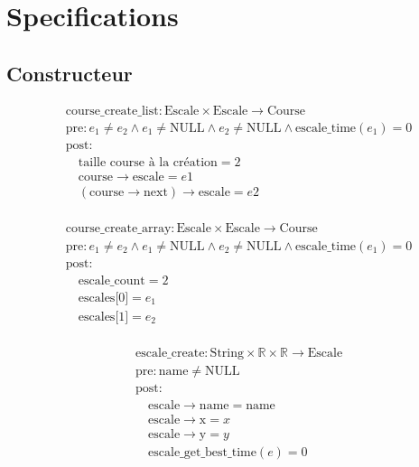 \section{Specifications}\label{specifications}

\subsection{Constructeur}


\[
\begin{aligned}
&\text{course\_create\_list}: \text{Escale} \times \text{Escale} \to \text{Course} \\
&\text{pre}: e_1 \neq e_2 \land e_1 \neq \text{NULL} \land e_2 \neq \text{NULL} \land \text{escale\_time}(e_1) = 0 \\
&\text{post}: \\
&\quad \text{taille course à la création} = 2 \\
&\quad \text{course}\rightarrow\text{escale} = e1 \\
&\quad (\text{course}\rightarrow\text{next})\rightarrow\text{escale} = e2 \\
\end{aligned}
\]



\[
\begin{aligned}
&\text{course\_create\_array}: \text{Escale} \times \text{Escale} \to \text{Course} \\
&\text{pre}: e_1 \neq e_2 \land e_1 \neq \text{NULL} \land e_2 \neq \text{NULL} \land \text{escale\_time}(e_1) = 0 \\
&\text{post}: \\
&\quad \text{escale_count} = 2 \\
&\quad \text{escales[0]} = e_1 \\
&\quad \text{escales[1]} = e_2 \\
\end{aligned}
\]


\[
\begin{aligned}
&\text{escale\_create}: \text{String} \times \mathbb{R} \times \mathbb{R} \to \text{Escale} \\
&\text{pre}: \text{name} \neq \text{NULL} \\
&\text{post}: \\
&\quad \text{escale}\rightarrow\text{name} = \text{name} \\
&\quad \text{escale}\rightarrow\text{x} = x \\
&\quad \text{escale}\rightarrow\text{y}= y \\
&\quad \text{escale\_get\_best\_time}(e) = 0
\end{aligned}
\]


